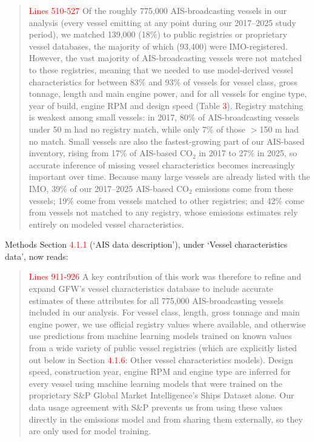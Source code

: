 \documentclass[11pt]{article}
\begin{document}
\begin{quote}
\textcolor{red}{Lines 510-527}
Of the roughly 775,000 AIS-broadcasting vessels in our analysis (every vessel emitting at any point during our 2017--2025 study period), we matched 139,000 (18\%) to public registries or proprietary vessel databases, the majority of which (93,400) were IMO-registered. However, the vast majority of AIS-broadcasting vessels were not matched to these registries, meaning that we needed to use model-derived vessel characteristics for between 83\% and 93\% of vessels for vessel class, gross tonnage, length and main engine power, and for all vessels for engine type, year of build, engine RPM and design speed (Table \textcolor{red}{3}). Registry matching is weakest among small vessels: in 2017, 80\% of AIS-broadcasting vessels under 50 m had no registry match, while only 7\% of those $>$150 m had no match. Small vessels are also the fastest-growing part of our AIS-based inventory, rising from 17\% of AIS-based CO$_{2}$ in 2017 to 27\% in 2025, so accurate inference of missing vessel characteristics becomes increasingly important over time. Because many large vessels are already listed with the IMO, 39\% of our 2017--2025 AIS-based CO$_{2}$ emissions come from these vessels; 19\% come from vessels matched to other registries; and 42\% come from vessels not matched to any registry, whose emissions estimates rely entirely on modeled vessel characteristics.
\end{quote}

Methods Section \textcolor{red}{4.1.1} (`AIS data description'), under `Vessel characteristics data', now reads:

\begin{quote}
\textcolor{red}{Lines 911-926}
A key contribution of this work was therefore to refine and expand GFW's vessel characteristics database to include accurate estimates of these attributes for all 775,000 AIS-broadcasting vessels included in our analysis. For vessel class, length, gross tonnage and main engine power, we use official registry values where available, and otherwise use predictions from machine learning models trained on known values from a wide variety of public vessel registries (which are explicitly listed out below in Section \textcolor{red}{4.1.6}: Other vessel characteristics models). Design speed, construction year, engine RPM and engine type are inferred for every vessel using machine learning models that were trained on the proprietary S\&P Global Market Intelligence's Ships Dataset alone. Our data usage agreement with S\&P prevents us from using these values directly in the emissions model and from sharing them externally, so they are only used for model training.
\end{quote}
\end{document}
